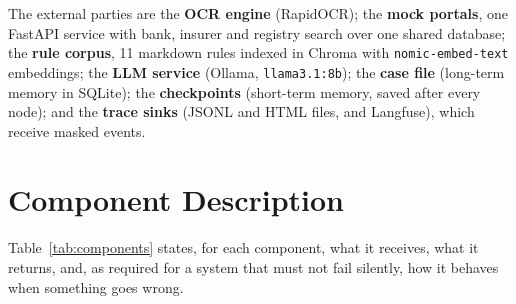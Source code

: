 The external parties are the \textbf{OCR engine} (RapidOCR); the \textbf{mock portals}, one FastAPI service with bank, insurer and registry search over one shared database; the \textbf{rule corpus}, 11 markdown rules indexed in Chroma with \texttt{nomic-embed-text} embeddings; the \textbf{LLM service} (Ollama, \texttt{llama3.1:8b}); the \textbf{case file} (long-term memory in SQLite); the \textbf{checkpoints} (short-term memory, saved after every node); and the \textbf{trace sinks} (JSONL and HTML files, and Langfuse), which receive masked events.

\section{Component Description}\label{sec:components}
Table~\ref{tab:components} states, for each component, what it receives, what it returns, and, as required for a system that must not fail silently, how it behaves when something goes wrong.

